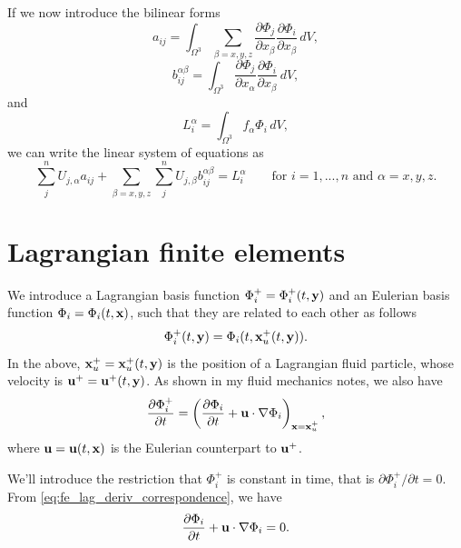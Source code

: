 \documentclass[oneside,a4paper,11pt]{report}
\begin{document}
If we now introduce the bilinear forms 
\begin{equation}
    a_{ij} = \int_{\Omega^3} \sum_{\beta=x,y,z} \frac{\partial \Phi_j}{\partial x_\beta} \frac{\partial \Phi_i}{\partial x_\beta} \,dV,
\end{equation}
\begin{equation}
    b_{ij}^{\alpha \beta} = \int_{\Omega^3}\frac{\partial \Phi_j}{\partial x_\alpha} \frac{\partial \Phi_i}{\partial x_\beta} \, dV,
\end{equation}
and
\begin{equation}
    L_i^\alpha = \int_{\Omega^3} f_\alpha \Phi_i \,dV,
\end{equation}
we can write the linear system of equations as
\begin{equation}
    \sum_j^n U_{j,\alpha} a_{ij} + \sum_{\beta=x,y,z} \sum_j^n U_{j,\beta} b_{ij}^{\alpha \beta} = L_i^\alpha \qquad \text{for } i = 1,...,n \text{ and } \alpha = x,y,z.
\end{equation}

\section{Lagrangian finite elements}
We introduce a Lagrangian basis function $\Phi_i^+ = \Phi_i^+(t,\mathbf{y})$ and an Eulerian basis function $\Phi_i = \Phi_i(t,\mathbf{x})$, such that they are related to each other as follows
\begin{equation}
    \label{eq:fe_lag_phi_correspondence}
    \Phi_i^+(t,\mathbf{y}) = \Phi_i(t,\mathbf{x}_u^+(t,\mathbf{y})).
\end{equation}
In the above, $\mathbf{x}_u^+ = \mathbf{x}_u^+(t,\mathbf{y})$ is the position of a Lagrangian fluid particle, whose velocity is $\mathbf{u}^+ = \mathbf{u}^+(t,\mathbf{y})$. As shown in my fluid mechanics notes, we also have
\begin{equation}
    \label{eq:fe_lag_deriv_correspondence}
    \frac{\partial \Phi_i^+}{\partial t} = \left ( \frac{\partial \Phi_i}{\partial t} + \mathbf{u} \cdot \nabla \Phi_i \right )_{\mathbf{x} = \mathbf{x}_u^+},
\end{equation}
where $\mathbf{u} = \mathbf{u}(t,\mathbf{x})$ is the Eulerian counterpart to $\mathbf{u}^+$.

We'll introduce the restriction that $\Phi_i^+$ is constant in time, that is $\partial \Phi_i^+/\partial t = 0$. From \cref{eq:fe_lag_deriv_correspondence}, we have
\begin{equation}
    \frac{\partial \Phi_i}{\partial t} + \mathbf{u} \cdot \nabla \Phi_i = 0.
\end{equation}
\end{document}
